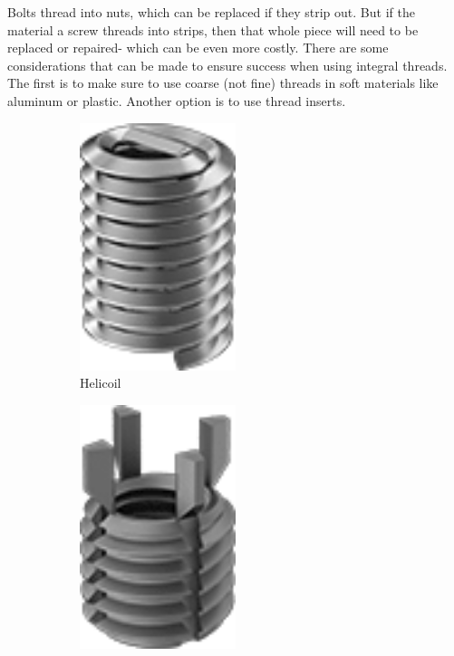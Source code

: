 	
	Bolts thread into nuts, which can be replaced if they strip out. But if the material a screw threads into strips, then that whole piece will need to be replaced or repaired- which can be even more costly. There are some considerations that can be made to ensure success when using integral threads. The first is to make sure to use coarse (not fine) threads in soft materials like aluminum or plastic. Another option is to use thread inserts.
	
	\begin{figure}[H]
		\centering
		\begin{subfigure}[b]{.24\linewidth}
			\includegraphics[width=0.5\textwidth]{imgs/helicoil.png}
			\caption{Helicoil}
		\end{subfigure}\begin{subfigure}[b]{.24\linewidth}
			\includegraphics[width=0.5\textwidth]{imgs/tanglock.png}

\end{subfigure}
\end{figure}
